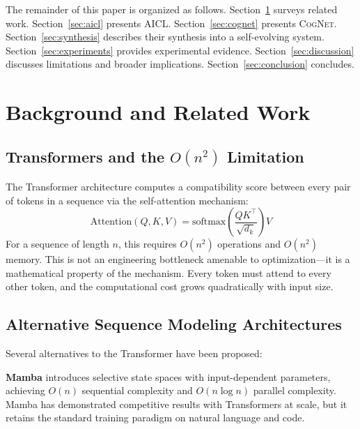 \documentclass[11pt]{article}
\newcommand{\aicl}{\textsc{AICL}}
\newcommand{\cognet}{\textsc{CogNet}}
\begin{document}
The remainder of this paper is organized as follows. Section~\ref{sec:background} surveys related work. Section~\ref{sec:aicl} presents \aicl{}. Section~\ref{sec:cognet} presents \cognet{}. Section~\ref{sec:synthesis} describes their synthesis into a self-evolving system. Section~\ref{sec:experiments} provides experimental evidence. Section~\ref{sec:discussion} discusses limitations and broader implications. Section~\ref{sec:conclusion} concludes.

\section{Background and Related Work}
\label{sec:background}

\subsection{Transformers and the $O(n^{2})$ Limitation}

The Transformer architecture \citep{vaswani2017attention} computes a compatibility score between every pair of tokens in a sequence via the self-attention mechanism:
\begin{equation}
  \text{Attention}(Q, K, V) = \text{softmax}\!\left(\frac{QK^{\top}}{\sqrt{d_{k}}}\right)V
\end{equation}
For a sequence of length $n$, this requires $O(n^{2})$ operations and $O(n^{2})$ memory. This is not an engineering bottleneck amenable to optimization---it is a mathematical property of the mechanism. Every token must attend to every other token, and the computational cost grows quadratically with input size.

\subsection{Alternative Sequence Modeling Architectures}

Several alternatives to the Transformer have been proposed:

\textbf{Mamba} \citep{gu2023mamba} introduces selective state spaces with input-dependent parameters, achieving $O(n)$ sequential complexity and $O(n \log n)$ parallel complexity. Mamba has demonstrated competitive results with Transformers at scale, but it retains the standard training paradigm on natural language and code.
\end{document}

